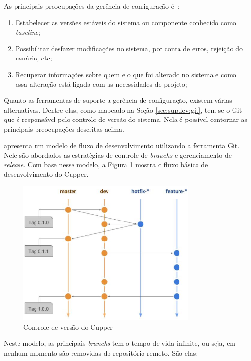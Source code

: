 As principais preocupações da gerência de configuração é~\cite{pressman:2009}:
\begin{enumerate}
  \item Estabelecer as versões estáveis do sistema ou componente conhecido
    como \textit{baseline};
  \item Possibilitar desfazer modificações no sistema, por conta de erros,
    rejeição do usuário, etc;
  \item Recuperar informações sobre quem e o que foi alterado no sistema e como
    essa alteração está ligada com as necessidades do projeto;
\end{enumerate}

Quanto as ferramentas de suporte a gerência de configuração, existem várias alternativas.
Dentre elas, como mapeado na Seção \ref{sec:supdev:git}, tem-se o Git que é responsável pelo
controle de versão do sistema. Nela é possível contornar as principais preocupações
descritas acima.

 apresenta um modelo de fluxo de desenvolvimento utilizando a
ferramenta Git. Nele são abordados as estratégias de controle de \textit{branchs} e
gerenciamento de \textit{release}. Com base nesse modelo, a Figura \ref{fig:ctrl_versao}
mostra o fluxo básico de desenvolvimento do Cupper.

\begin{figure}[H]
  \centering
  \caption{Controle de versão do Cupper}
  \label{fig:ctrl_versao}
  \includegraphics[width=0.8\textwidth]{figuras/controle_versao}
\end{figure}

Neste modelo, as principais \textit{branchs} tem o tempo de vida infinito, ou seja,
em nenhum momento são removidas do repositório remoto. São elas:

